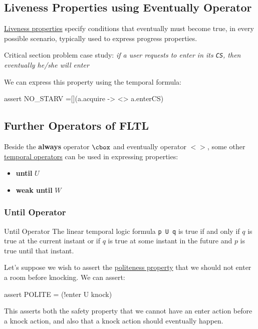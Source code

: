 \subsection{Liveness Properties using Eventually Operator}\label{sub:an_liveness_properties_using_eventually_operator} %
\hyperref[def:liveness-prop]{Liveness properties} specify conditions that eventually must become true, in every possible scenario, typically used to express progress properties.
\begin{note}[No Starvation]
    Critical section problem case study: \textit{if a user requests to enter in its \texttt{CS}, then eventually he/she will enter}
\end{note}
We can express this property using the temporal formula:
\begin{codeblock}[fsp]{}
    assert NO_STARV =[](a.acquire -> <> a.enterCS)
\end{codeblock}
%
\subsection{Further Operators of FLTL}\label{sub:an_further_operators_of_fltl} %
Beside the \textbf{always} operator $\cbox$ and eventually operator $<>$, some other \hyperref[sub:an_ltl_temporal_operators]{temporal operators} can be used in expressing properties:
\begin{itemize}
    \item \textbf{until} $U$
    \item \textbf{weak until} $W$
\end{itemize}
%
\subsubsection{Until Operator}\label{sub:an_until_operator} %
\begin{definition}{Until Operator}{}
    The linear temporal logic formula \texttt{p U q} is true if and only if $q$ is true at the current instant or if $q$ is true at some instant in the future and $p$ is true until that instant.
\end{definition}
\begin{example}{}{}
    Let's suppose we wish to assert the \hyperref[ex:polit-prop]{politeness property} that we should not enter a room before knocking.
    We can assert:
    \begin{codeblock}[fsp]{}
    assert POLITE = (!enter U knock)
    \end{codeblock}
    This asserts both the safety property that we cannot have an enter action before a knock action, and also that a knock action should eventually happen.
\end{example}
%
